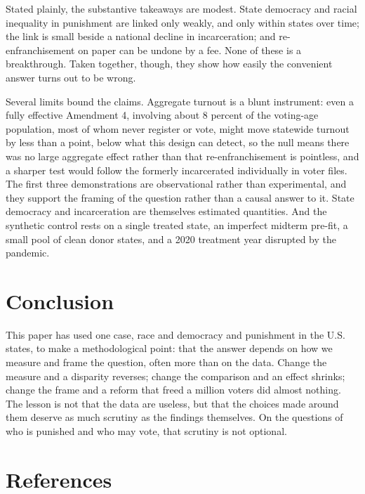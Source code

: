 \documentclass[
  12pt,
]{article}
\begin{document}
Stated plainly, the substantive takeaways are modest. State democracy
and racial inequality in punishment are linked only weakly, and only
within states over time; the link is small beside a national decline in
incarceration; and re-enfranchisement on paper can be undone by a fee.
None of these is a breakthrough. Taken together, though, they show how
easily the convenient answer turns out to be wrong.

Several limits bound the claims. Aggregate turnout is a blunt
instrument: even a fully effective Amendment 4, involving about 8
percent of the voting-age population, most of whom never register or
vote, might move statewide turnout by less than a point, below what this
design can detect, so the null means there was no large aggregate effect
rather than that re-enfranchisement is pointless, and a sharper test
would follow the formerly incarcerated individually in voter files. The
first three demonstrations are observational rather than experimental,
and they support the framing of the question rather than a causal answer
to it. State democracy and incarceration are themselves estimated
quantities. And the synthetic control rests on a single treated state,
an imperfect midterm pre-fit, a small pool of clean donor states, and a
2020 treatment year disrupted by the pandemic.

\section{Conclusion}\label{conclusion}

This paper has used one case, race and democracy and punishment in the
U.S. states, to make a methodological point: that the answer depends on
how we measure and frame the question, often more than on the data.
Change the measure and a disparity reverses; change the comparison and
an effect shrinks; change the frame and a reform that freed a million
voters did almost nothing. The lesson is not that the data are useless,
but that the choices made around them deserve as much scrutiny as the
findings themselves. On the questions of who is punished and who may
vote, that scrutiny is not optional.

\section*{References}\label{references}

\begingroup
\setlength{\parindent}{-0.5in}
\setlength{\leftskip}{0.5in}
\end{document}
